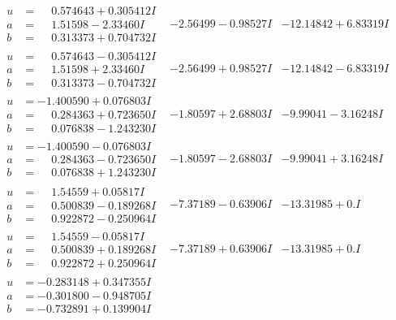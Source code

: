 \documentclass[1p]{elsarticle_modified}
\theoremstyle{definition}
\begin{document}
$$\begin{array}{c|c|c}
\begin{aligned}
u &= \phantom{-}0.574643 + 0.305412 I \\
a &= \phantom{-}1.51598 - 2.33460 I \\
b &= \phantom{-}0.313373 + 0.704732 I\end{aligned}
 & -2.56499 - 0.98527 I & -12.14842 + 6.83319 I \\ \hline\begin{aligned}
u &= \phantom{-}0.574643 - 0.305412 I \\
a &= \phantom{-}1.51598 + 2.33460 I \\
b &= \phantom{-}0.313373 - 0.704732 I\end{aligned}
 & -2.56499 + 0.98527 I & -12.14842 - 6.83319 I \\ \hline\begin{aligned}
u &= -1.400590 + 0.076803 I \\
a &= \phantom{-}0.284363 + 0.723650 I \\
b &= \phantom{-}0.076838 - 1.243230 I\end{aligned}
 & -1.80597 + 2.68803 I & -9.99041 - 3.16248 I \\ \hline\begin{aligned}
u &= -1.400590 - 0.076803 I \\
a &= \phantom{-}0.284363 - 0.723650 I \\
b &= \phantom{-}0.076838 + 1.243230 I\end{aligned}
 & -1.80597 - 2.68803 I & -9.99041 + 3.16248 I \\ \hline\begin{aligned}
u &= \phantom{-}1.54559 + 0.05817 I \\
a &= \phantom{-}0.500839 - 0.189268 I \\
b &= \phantom{-}0.922872 - 0.250964 I\end{aligned}
 & -7.37189 - 0.63906 I & -13.31985 + 0. I\phantom{ +0.000000I} \\ \hline\begin{aligned}
u &= \phantom{-}1.54559 - 0.05817 I \\
a &= \phantom{-}0.500839 + 0.189268 I \\
b &= \phantom{-}0.922872 + 0.250964 I\end{aligned}
 & -7.37189 + 0.63906 I & -13.31985 + 0. I\phantom{ +0.000000I} \\ \hline\begin{aligned}
u &= -0.283148 + 0.347355 I \\
a &= -0.301800 - 0.948705 I \\
b &= -0.732891 + 0.139904 I\end{aligned}

\end{array}$$
\end{document}
